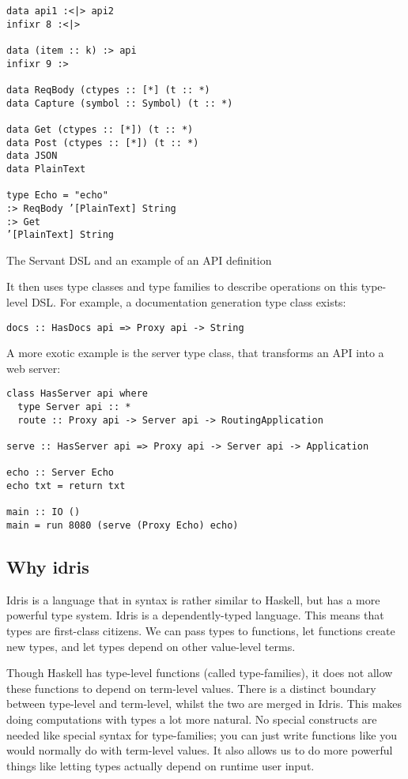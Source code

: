 \documentclass[12pt,a4paper]{article}
\begin{document}
\begin{listing}[H]
\begin{verbatim}
data api1 :<|> api2
infixr 8 :<|>

data (item :: k) :> api
infixr 9 :>

data ReqBody (ctypes :: [*] (t :: *)
data Capture (symbol :: Symbol) (t :: *)

data Get (ctypes :: [*]) (t :: *)
data Post (ctypes :: [*]) (t :: *)
data JSON
data PlainText

type Echo = "echo"
:> ReqBody ’[PlainText] String
:> Get
’[PlainText] String
\end{verbatim}
\caption{The Servant DSL and an example of an API definition}
\label{lab:servant}
\end{listing}

It then uses type classes and type families to describe operations on this type-level DSL. For example,
a documentation generation type class exists:
\begin{verbatim}
docs :: HasDocs api => Proxy api -> String
\end{verbatim}

A more exotic example is the server type class, that transforms an API into a web server:
\begin{verbatim}
class HasServer api where
  type Server api :: *
  route :: Proxy api -> Server api -> RoutingApplication

serve :: HasServer api => Proxy api -> Server api -> Application

echo :: Server Echo 
echo txt = return txt

main :: IO ()
main = run 8080 (serve (Proxy Echo) echo)
\end{verbatim}


\subsection{Why idris}
Idris is a language that in syntax is rather similar to Haskell, but has a more powerful type system. Idris is a dependently-typed language. This means that types are first-class citizens. We can pass types to functions, let functions create new types, and let types depend on other value-level terms.

Though Haskell has type-level functions (called type-families), it does not allow these functions to depend on term-level values. There is a distinct boundary between type-level and term-level, whilst the two are merged in Idris. This makes doing computations with types a lot more natural. No special constructs are needed like special syntax for type-families; you can just write functions like you would normally do with term-level values. It also allows us to do more powerful things like letting types actually depend on runtime user input.
\end{document}
